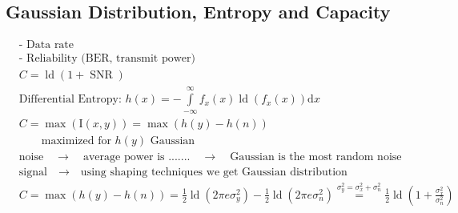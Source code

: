 \documentclass[fleqn]{article}
\DeclareMathOperator{\ld}{ld}
\DeclareMathOperator{\SNR}{SNR}
\begin{document}
\subsection*{Gaussian Distribution, Entropy and Capacity}
\begin{align*}
	&\text{- Data rate}& \\
	&\text{- Reliability (BER, transmit power)}& \\
	&C = \ld\left(1+\SNR\right)& \\
	&\text{Differential Entropy: } h\left(x\right)=-\int\limits_{-\infty}^{\infty}f_{x}\left(x\right)\ld\left(f_{x}\left(x\right)\right)\mathrm{d}x& \\
	&C=\max\left(\mathrm{I}\left(x,y\right)\right)=\max\left(h\left(y\right)-h\left(n\right)\right)& \\
	&\qquad\text{maximized for $h\left(y\right)$ Gaussian}& \\
	&\text{noise$\quad\rightarrow\quad$average power is .......$\quad\rightarrow\quad$Gaussian is the most random noise}& \\
	&\text{signal$\quad\rightarrow\quad$using shaping techniques we get Gaussian distribution}& \\
	&C=\max\left(h\left(y\right)-h\left(n\right)\right)=\frac{1}{2}\ld\left(2\pi e\sigma_{y}^{2}\right)-\frac{1}{2}\ld\left(2\pi e\sigma_{n}^{2}\right)\overset{\sigma_{y}^{2}=\sigma_{x}^{2}+\sigma_{n}^{2}}{=}\frac{1}{2}\ld\left(1+\frac{\sigma_{x}^{2}}{\sigma_{n}^{2}}\right)& \\
\end{align*}
\end{document}
